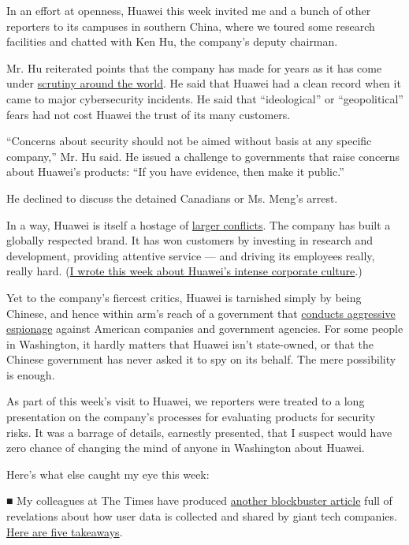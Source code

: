 In an effort at openness, Huawei this week invited me and a bunch of
other reporters to its campuses in southern China, where we toured some
research facilities and chatted with Ken Hu, the company's deputy
chairman.

Mr. Hu reiterated points that the company has made for years as it has
come under
\href{https://www.nytimes.com/2018/12/06/technology/huawei-arrest-meng-wanzhou.html}{scrutiny
around the world}. He said that Huawei had a clean record when it came
to major cybersecurity incidents. He said that ``ideological'' or
``geopolitical'' fears had not cost Huawei the trust of its many
customers.

``Concerns about security should not be aimed without basis at any
specific company,'' Mr. Hu said. He issued a challenge to governments
that raise concerns about Huawei's products: ``If you have evidence,
then make it public.''

He declined to discuss the detained Canadians or Ms. Meng's arrest.

In a way, Huawei is itself a hostage of
\href{https://www.nytimes.com/2018/12/10/business/huawei-meng-arrest-travel.html}{larger
conflicts}. The company has built a globally respected brand. It has won
customers by investing in research and development, providing attentive
service --- and driving its employees really, really hard.
(\href{https://www.nytimes.com/2018/12/18/technology/huawei-workers-iran-sanctions.html}{I
wrote this week about Huawei's intense corporate culture}.)

Yet to the company's fiercest critics, Huawei is tarnished simply by
being Chinese, and hence within arm's reach of a government that
\href{https://www.nytimes.com/2018/11/29/us/politics/china-trump-cyberespionage.html}{conducts
aggressive espionage} against American companies and government
agencies. For some people in Washington, it hardly matters that Huawei
isn't state-owned, or that the Chinese government has never asked it to
spy on its behalf. The mere possibility is enough.

As part of this week's visit to Huawei, we reporters were treated to a
long presentation on the company's processes for evaluating products for
security risks. It was a barrage of details, earnestly presented, that I
suspect would have zero chance of changing the mind of anyone in
Washington about Huawei.

Here's what else caught my eye this week:

■ My colleagues at The Times have produced
\href{https://www.nytimes.com/2018/12/18/technology/facebook-privacy.html}{another
blockbuster article} full of revelations about how user data is
collected and shared by giant tech companies.
\href{https://www.nytimes.com/2018/12/18/us/politics/facebook-data-sharing-deals.html}{Here
are five takeaways}.

